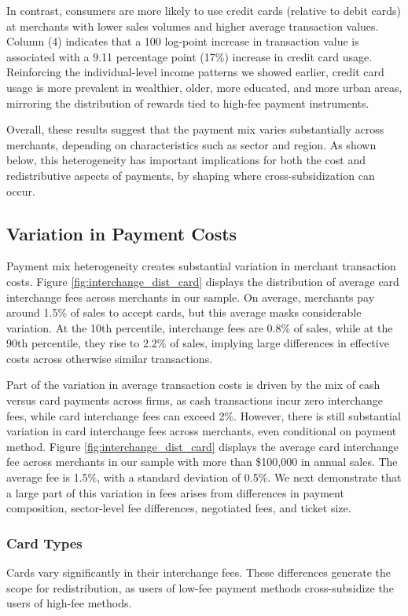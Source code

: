 \documentclass[11pt,english]{article}
\theoremstyle{remark}
\begin{document}
In contrast, consumers are more likely to use credit cards (relative to debit cards) at merchants with lower sales volumes and higher average transaction values.
Column (4) indicates that a 100 log-point increase in transaction value is associated with a 9.11 percentage point (17\%) increase in credit card usage.
Reinforcing the individual-level income patterns we showed earlier, credit card usage is more prevalent in wealthier, older, more educated, and more urban areas, mirroring the distribution of rewards tied to high-fee payment instruments.

Overall, these results suggest that the payment mix varies substantially across merchants, depending on characteristics such as sector and region.
As shown below, this heterogeneity has important implications for both the cost and redistributive aspects of payments, by shaping where cross-subsidization can occur.

\subsection{Variation in Payment Costs}
Payment mix heterogeneity creates substantial variation in merchant transaction costs.
Figure \ref{fig:interchange_dist_card} displays the distribution of average card interchange fees across merchants in our sample.
On average, merchants pay around 1.5\% of sales to accept cards, but this average masks considerable variation.
At the 10th percentile, interchange fees are 0.8\% of sales, while at the 90th percentile, they rise to 2.2\% of sales, implying large differences in effective costs across otherwise similar transactions.

Part of the variation in average transaction costs is driven by the mix of cash versus card payments across firms, as cash transactions incur zero interchange fees, while card interchange fees can exceed 2\%.
However, there is still substantial variation in card interchange fees across merchants, even conditional on payment method.
Figure \ref{fig:interchange_dist_card} displays the average card interchange fee across merchants in our sample with more than \$100,000 in annual sales.
The average fee is 1.5\%, with a standard deviation of 0.5\%.
We next demonstrate that a large part of this variation in fees arises from differences in payment composition, sector-level fee differences, negotiated fees, and ticket size.



\subsubsection{Card Types\label{subsec:card-types}}
Cards vary significantly in their interchange fees.
These differences generate the scope for redistribution, as users of low-fee payment methods cross-subsidize the users of high-fee methods.
\end{document}
